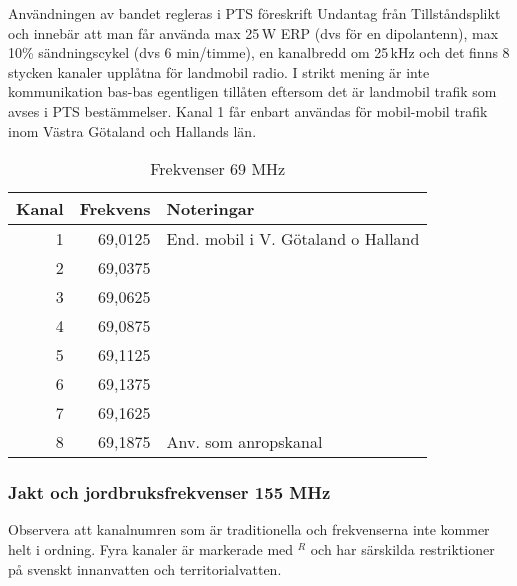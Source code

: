 Användningen av bandet regleras i PTS föreskrift Undantag från Tillståndsplikt
och innebär att man får använda max 25\,W ERP (dvs för en dipolantenn), max
10\% sändningscykel (dvs 6 min/timme), en kanalbredd om 25\,kHz och det finns
8 stycken kanaler upplåtna för landmobil radio. I strikt mening är inte
kommunikation bas-bas egentligen tillåten eftersom det är landmobil trafik som
avses i PTS bestämmelser. Kanal 1 får enbart användas för mobil-mobil trafik
inom Västra Götaland och Hallands län.

\begin{table}[ht]
  \centering
\begin{tabular}{rrl}
  Kanal & Frekvens & Noteringar                         \\ \hline
  1     & 69,0125  & End. mobil i V. Götaland o Halland \\
  2     & 69,0375  &                                    \\
  3     & 69,0625  &                                    \\
  4     & 69,0875  &                                    \\
  5     & 69,1125  &                                    \\
  6     & 69,1375  &                                    \\
  7     & 69,1625  &                                    \\
  8     & 69,1875  & Anv. som anropskanal               \\
\end{tabular}
\caption{Frekvenser 69 MHz}
\end{table}

\subsubsection{Jakt och jordbruksfrekvenser 155 MHz}

Observera att kanalnumren som är traditionella och frekvenserna inte
kommer helt i ordning. Fyra kanaler är markerade med $^R$ och har
särskilda restriktioner på svenskt innanvatten och territorialvatten.

